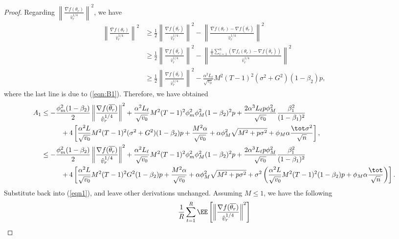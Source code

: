 \documentclass[nohyperref]{article}
\theoremstyle{plain}
\theoremstyle{definition}
\theoremstyle{remark}
\begin{document}
\begin{proof}
Regarding $\left\| \frac{\overline{\nabla}f(\theta_r)}{\hat v_r^{1/4}} \right\|^2$, we have
\begin{align*}
\left\| \frac{\overline{\nabla}f(\theta_r)}{\hat v_r^{1/4}} \right\|^2 & \geq \frac{1}{2} \left\| \frac{\nabla f(\overline{\theta_r})}{\hat v_r^{1/4}} \right\|^2 - \left\| \frac{\overline{\nabla}f(\theta_r)- \nabla f(\overline{\theta_r})}{\hat v_r^{1/4}} \right\|^2\\
& \geq \frac{1}{2} \left\| \frac{\nabla f(\overline{\theta_r})}{\hat v_r^{1/4}} \right\|^2 - \left\| \frac{\frac{1}{n}\sum_{i=1}^n (\nabla f_i(\theta_{r})-\nabla f(\bar\theta_r))}{\hat v_r^{1/4}} \right\|^2 \\
&\geq \frac{1}{2} \left\| \frac{\nabla f(\overline{\theta_r})}{\hat v_r^{1/4}} \right\|^2 - \frac{\alpha^2 L_\ell}{\sqrt{v_0}} M^2 (T-1)^2 (\sigma^2 + G^2) (1-\beta_2)p,
\end{align*}
where the last line is due to (\ref{eqn:B1}). Therefore, we have obtained
\begin{align*}
    A_1&\leq -\frac{\phi_m^2(1-\beta_2)}{2}\left\| \frac{\nabla f(\overline{\theta_r})}{\hat v_r^{1/4}} \right\|^2+\frac{\alpha^2 L_\ell}{\sqrt{v_0}} M^2 (T-1)^2 \phi_m^2\phi_M^2 (1-\beta_2)^2p+\frac{2\alpha^3 L_\ell p\phi_M^2}{ \sqrt{v_0}}\frac{\beta_1^2}{(1-\beta_1)^2} \\
    &\hspace{0.4in}  + 4 \left[ \frac{\alpha^2 L}{\sqrt{v_0}}  M^2 (T-1)^2 (\sigma^2 + G^2) (1-\beta_2)p + \frac{M^2 \alpha }{\sqrt{v_0}}+ \alpha \phi_M^2\sqrt{M^2+p\sigma^2} + \phi_M \alpha \frac{\tot \sigma^2}{\sqrt{n}}\right],\\
    &\leq -\frac{\phi_m^2(1-\beta_2)}{2}\left\| \frac{\nabla f(\overline{\theta_r})}{\hat v_r^{1/4}} \right\|^2+\frac{\alpha^2 L_\ell}{\sqrt{v_0}} M^2 (T-1)^2 \phi_m^2\phi_M^2 (1-\beta_2)^2p+\frac{2\alpha^3 L_\ell p\phi_M^2}{ \sqrt{v_0}}\frac{\beta_1^2}{(1-\beta_1)^2} \\
    &\hspace{0.4in}  + 4 \left[ \frac{\alpha^2 L}{\sqrt{v_0}}  M^2 (T-1)^2 G^2 (1-\beta_2)p + \frac{M^2 \alpha }{\sqrt{v_0}}+ \alpha \phi_M^2\sqrt{M^2+p\sigma^2} + \sigma^2 \left(\frac{\alpha^2 L}{\sqrt{v_0}}  M^2 (T-1)^2(1-\beta_2)p+ \phi_M \alpha \frac{\tot }{\sqrt{n}} \right)\right].
\end{align*}
Substitute back into (\ref{eqn1}), and leave other derivations unchanged. Assuming $M\leq 1$, we have the following
\begin{align*}
    &\frac{1}{R}\sum_{t=1}^R  \EE\left[ \left\| \frac{\nabla f(\overline{\theta_r})}{\hat v_r^{1/4}}   \right \|^2 \right] \\

\end{align*}
\end{proof}
\end{document}
